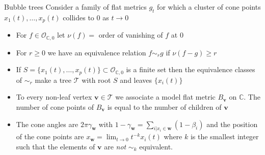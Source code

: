 \documentclass{beamer}
\newcommand{\C}{\mathbb{C}}
\begin{document}
\begin{frame}{Bubble trees}
	Consider a family of flat metrics \(g_t\) for which a cluster of cone points \(x_1(t), \ldots, x_p(t)\) collides to \(0\) as \(t \to 0\)
	\begin{itemize}
		\pause
		\item For \(f \in \mathcal{O}_{\C, 0}\) let \(\nu(f) = \) order of vanishing of \(f\) at \(0\)
		\pause
		\item For \(r \geq 0\) we have an equivalence relation \(f \sim_r g\) if \(\nu(f-g) \geq r\)
		\pause
		\item If \(S = \{x_1(t), \ldots, x_p(t)\} \subset \mathcal{O}_{\C, 0}\) is a finite set then the equivalence classes of \(\sim_r\) make a tree \(\mathcal{T}\) with root \(S\) and leaves \(\{x_i(t)\}\)
		\pause
		\item To every non-leaf vertex \(\mathbf{v} \in \mathcal{T}\) we associate a model flat metric \(B_{\mathbf{v}}\) on \(\C\). The number of cone points of \(B_{\mathbf{v}}\) is equal to the number of children of \(\mathbf{v}\)
		\pause
		\item  The cone angles are \(2\pi\gamma_{\mathbf{w}}\) with \(1-\gamma_{\mathbf{w}} = \sum_{i | x_i \in \mathbf{w}} (1-\beta_i)\) and the position of the cone points are \(x_{\mathbf{w}} = \lim_{t \to 0} t^{-k} x_i(t)\) where \(k\) is the smallest integer such that the elements of \(\mathbf{v}\) are \emph{not} \(\sim_k\) equivalent.  
	\end{itemize}
\end{frame}
\end{document}
